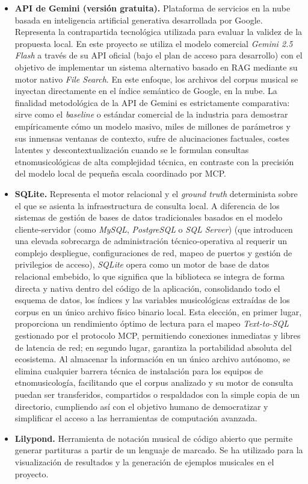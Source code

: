 \begin{itemize}
\item \textbf{API de Gemini (versión gratuita).} Plataforma de servicios en la nube basada en inteligencia artificial generativa desarrollada por Google. Representa  la contrapartida tecnológica utilizada para evaluar la validez de la propuesta local. En este proyecto se utiliza el modelo comercial \textit{Gemini 2.5 Flash} a través de su API oficial (bajo el plan de acceso para desarrollo) con el objetivo de implementar un sistema alternativo basado en RAG mediante su motor nativo \textit{File Search}. En este enfoque, los archivos del corpus musical se inyectan directamente en el índice semántico de Google, en la nube. La finalidad metodológica de la API de Gemini es estrictamente comparativa: sirve como el \textit{baseline} o estándar comercial de la industria para demostrar empíricamente cómo un modelo masivo, miles de millones de parámetros y sus inmensas ventanas de contexto, sufre de alucinaciones factuales, costes latentes y descontextualización cuando se le formulan consultas etnomusicológicas de alta complejidad técnica, en contraste con la precisión del modelo local de pequeña escala coordinado por MCP.
\item \textbf{SQLite.} Representa el motor relacional y el \textit{ground truth} determinista sobre el que se asienta la infraestructura de consulta local. A diferencia de los sistemas de gestión de bases de datos tradicionales basados en el modelo cliente-servidor (como \textit{MySQL}, \textit{PostgreSQL} o \textit{SQL Server}) (que introducen una elevada sobrecarga de administración técnico-operativa al requerir un complejo despliegue, configuraciones de red, mapeo de puertos y gestión de privilegios de acceso), \textit{SQLite} opera como un motor de base de datos relacional embebido, lo que significa que la biblioteca se integra de forma directa y nativa dentro del código de la aplicación, consolidando todo el esquema de datos, los índices y las variables musicológicas extraídas de los corpus en un único archivo físico binario local. Esta elección, en primer lugar, proporciona un rendimiento óptimo de lectura para el mapeo \textit{Text-to-SQL} gestionado por el protocolo MCP, permitiendo conexiones inmediatas y libres de latencia de red; en segundo lugar, garantiza la portabilidad absoluta del ecosistema. Al almacenar la información en un único archivo autónomo, se elimina cualquier barrera técnica de instalación para los equipos de etnomusicología, facilitando que el corpus analizado y su motor de consulta puedan ser transferidos, compartidos o respaldados con la simple copia de un directorio, cumpliendo así con el objetivo humano de democratizar y simplificar el acceso a las herramientas de computación avanzada.
\item \textbf{Lilypond.} Herramienta de notación musical de código abierto que permite generar partituras a partir de un lenguaje de marcado. Se ha utilizado para la visualización de resultados y la generación de ejemplos musicales en el proyecto.
\end{itemize}

